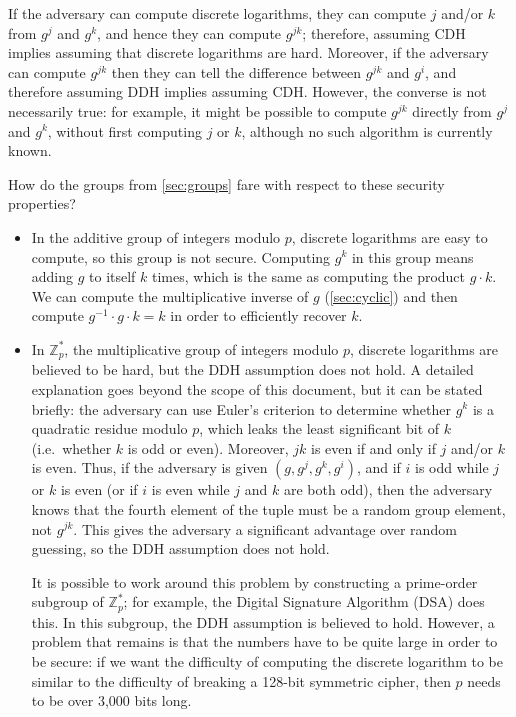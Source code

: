 \documentclass[manuscript]{acmart}
\begin{document}
If the adversary can compute discrete logarithms, they can compute $j$ and/or $k$ from $g^j$ and $g^k$, and hence they can compute $g^{jk}$; therefore, assuming CDH implies assuming that discrete logarithms are hard.
Moreover, if the adversary can compute $g^{jk}$ then they can tell the difference between $g^{jk}$ and $g^i$, and therefore assuming DDH implies assuming CDH.
However, the converse is not necessarily true: for example, it might be possible to compute $g^{jk}$ directly from $g^j$ and $g^k$, without first computing $j$ or $k$, although no such algorithm is currently known.

How do the groups from \autoref{sec:groups} fare with respect to these security properties?
\begin{itemize}
\item In the additive group of integers modulo $p$, discrete logarithms are easy to compute, so this group is not secure.
    Computing $g^k$ in this group means adding $g$ to itself $k$ times, which is the same as computing the product $g \cdot k$.
    We can compute the multiplicative inverse of $g$ (\autoref{sec:cyclic}) and then compute $g^{-1} \cdot g \cdot k = k$ in order to efficiently recover $k$.

\item In $\mathbb{Z}_p^*$, the multiplicative group of integers modulo $p$, discrete logarithms are believed to be hard, but the DDH assumption does not hold.
    A detailed explanation goes beyond the scope of this document, but it can be stated briefly: the adversary can use Euler's criterion to determine whether $g^k$ is a quadratic residue modulo $p$, which leaks the least significant bit of $k$ (i.e.\ whether $k$ is odd or even).
    Moreover, $jk$ is even if and only if $j$ and/or $k$ is even.
    Thus, if the adversary is given $(g, g^j, g^k, g^i)$, and if $i$ is odd while $j$ or $k$ is even (or if $i$ is even while $j$ and $k$ are both odd), then the adversary knows that the fourth element of the tuple must be a random group element, not $g^{jk}$.
    This gives the adversary a significant advantage over random guessing, so the DDH assumption does not hold.

    It is possible to work around this problem by constructing a prime-order subgroup of $\mathbb{Z}_p^*$; for example, the Digital Signature Algorithm (DSA) does this.
    In this subgroup, the DDH assumption is believed to hold.
    However, a problem that remains is that the numbers have to be quite large in order to be secure: if we want the difficulty of computing the discrete logarithm to be similar to the difficulty of breaking a 128-bit symmetric cipher, then $p$ needs to be over 3,000 bits long.


\end{itemize}
\end{document}
